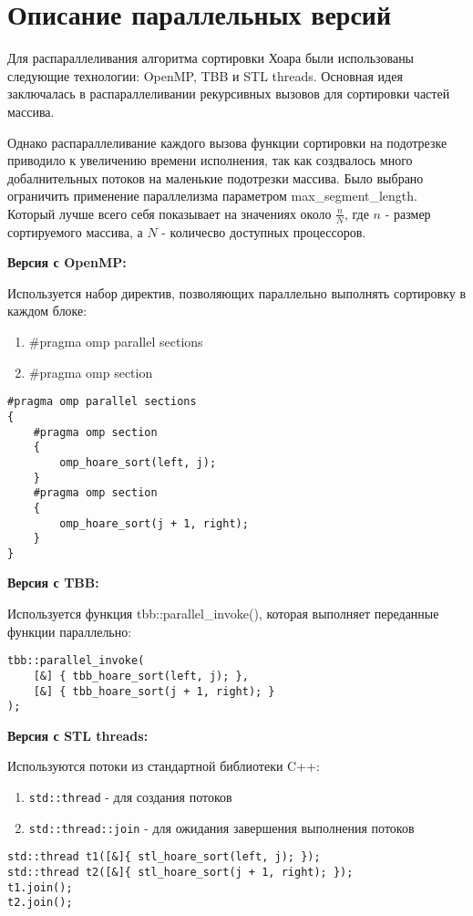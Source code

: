 \documentclass{report}
\begin{document}
\newpage

\section*{Описание параллельных версий}
\par Для распараллеливания алгоритма сортировки Хоара были использованы следующие технологии: OpenMP, TBB и STL threads. Основная идея заключалась в распараллеливании рекурсивных вызовов для сортировки частей массива.

\par Однако распараллеливание каждого вызова функции сортировки на подотрезке приводило к увеличению времени исполнения, так как создвалось много добалнительных потоков на маленькие подотрезки массива. Было выбрано ограничить применение параллелизма параметром max\_segment\_length. Который лучше всего себя показывает на значениях около \(\frac{n}{N}\), где \(n\) - размер сортируемого массива, а \(N\) - количесво доступных процессоров.

\par \textbf{Версия с OpenMP:}
\par Используется набор директив, позволяющих параллельно выполнять сортировку в каждом блоке:
\begin{enumerate}
    \item \#pragma omp parallel sections
    \item \#pragma omp section 
\end{enumerate}
\begin{lstlisting}
#pragma omp parallel sections
{
    #pragma omp section
    {
        omp_hoare_sort(left, j);
    }
    #pragma omp section
    {
        omp_hoare_sort(j + 1, right);
    }
}
\end{lstlisting}

\par \textbf{Версия с TBB:}
\par Используется функция tbb::parallel\_invoke(), которая выполняет переданные функции параллельно:
\begin{lstlisting}
tbb::parallel_invoke(
    [&] { tbb_hoare_sort(left, j); }, 
    [&] { tbb_hoare_sort(j + 1, right); }
);
\end{lstlisting}

\par \textbf{Версия с STL threads:}
\par Используются потоки из стандартной библиотеки C++:
\begin{enumerate}
    \item \texttt{std::thread} - для создания потоков
    \item \texttt{std::thread::join} - для ожидания завершения выполнения потоков
\end{enumerate}
\begin{lstlisting}
std::thread t1([&]{ stl_hoare_sort(left, j); });
std::thread t2([&]{ stl_hoare_sort(j + 1, right); });
t1.join();
t2.join();
\end{lstlisting}
\end{document}

